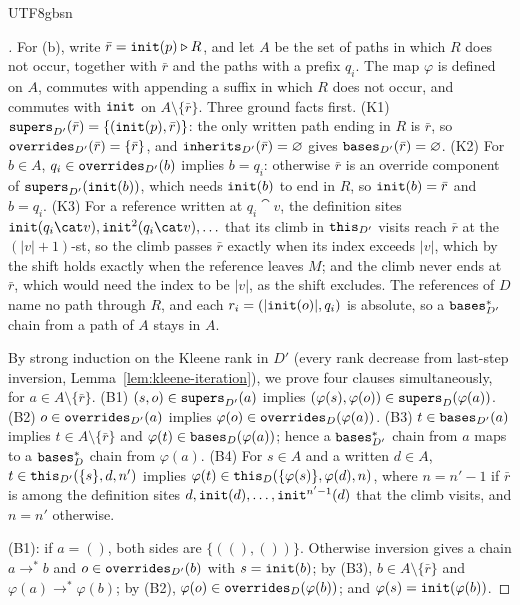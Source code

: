 \begin{CJK*}{UTF8}{gbsn}
\begin{proof}[]
\begin{sloppypar}
For (b), write $\bar r = \mathtt{init}(p) \mathbin{\triangleright} R$, and let $A$ be the set of paths in which $R$ does not occur,
together with $\bar r$ and the paths with a prefix $q_i$. The map $\varphi$ is defined on $A$, commutes
with appending a suffix in which $R$ does not occur, and commutes with $\mathtt{init}$ on
$A \setminus \{\bar r\}$. Three ground facts first. (K1) $\mathtt{supers}_{D'}(\bar r) = \{(\mathtt{init}(p), \bar r)\}$:
the only written path ending in $R$ is $\bar r$, so $\mathtt{overrides}_{D'}(\bar r) = \{\bar r\}$, and
$\mathtt{inherits}_{D'}(\bar r) = \varnothing$ gives $\mathtt{bases}_{D'}(\bar r) = \varnothing$. (K2) For $b \in A$,
$q_i \in \mathtt{overrides}_{D'}(b)$ implies $b = q_i$: otherwise $\bar r$ is an override component of
$\mathtt{supers}_{D'}(\mathtt{init}(b))$, which needs $\mathtt{init}(b)$ to end in $R$, so $\mathtt{init}(b) = \bar r$ and $b = q_i$.
(K3) For a reference written at $q_i \cat v$, the definition sites
$\init(q_i \cat v), \init^2(q_i \cat v), \ldots$ that its climb in $\mathtt{this}_{D'}$ visits reach $\bar r$ at
the $(|v| + 1)$-st, so the climb passes $\bar r$ exactly when its index exceeds $|v|$, which by the
shift holds exactly when the reference leaves $M$; and the climb never ends at $\bar r$, which would
need the index to be $|v|$, as the shift excludes. The references of $D$ name no path through $R$, and
each $r_i = (|\mathtt{init}(o)|, q_i)$ is absolute, so a $\mathtt{bases}^*_{D'}$ chain from a path of $A$ stays in $A$.

By strong induction on the Kleene rank in $D'$ (every rank decrease from last-step inversion,
Lemma~\ref{lem:kleene-iteration}), we prove four clauses simultaneously, for $a \in A \setminus \{\bar r\}$.
(B1) $(s, o) \in \mathtt{supers}_{D'}(a)$ implies $(\varphi(s), \varphi(o)) \in \mathtt{supers}_D(\varphi(a))$.
(B2) $o \in \mathtt{overrides}_{D'}(a)$ implies $\varphi(o) \in \mathtt{overrides}_D(\varphi(a))$.
(B3) $t \in \mathtt{bases}_{D'}(a)$ implies $t \in A \setminus \{\bar r\}$ and
$\varphi(t) \in \mathtt{bases}_D(\varphi(a))$; hence a $\mathtt{bases}^*_{D'}$ chain from $a$ maps to a $\mathtt{bases}^*_D$
chain from $\varphi(a)$.
(B4) For $s \in A$ and a written $d \in A$, $t \in \mathtt{this}_{D'}(\{s\}, d, n')$ implies
$\varphi(t) \in \mathtt{this}_D(\{\varphi(s)\}, \varphi(d), n)$, where $n = n' - 1$ if $\bar r$ is among the
definition sites $d, \mathtt{init}(d), \ldots, \mathtt{init}^{n'-1}(d)$ that the climb visits, and $n = n'$ otherwise.

(B1): if $a = ()$, both sides are $\{((), ())\}$. Otherwise inversion gives a chain $a \to^* b$ and
$o \in \mathtt{overrides}_{D'}(b)$ with $s = \mathtt{init}(b)$; by (B3), $b \in A \setminus \{\bar r\}$ and
$\varphi(a) \to^* \varphi(b)$; by (B2), $\varphi(o) \in \mathtt{overrides}_D(\varphi(b))$; and
$\varphi(s) = \mathtt{init}(\varphi(b))$.


\end{sloppypar}
\end{proof}
\end{CJK*}

